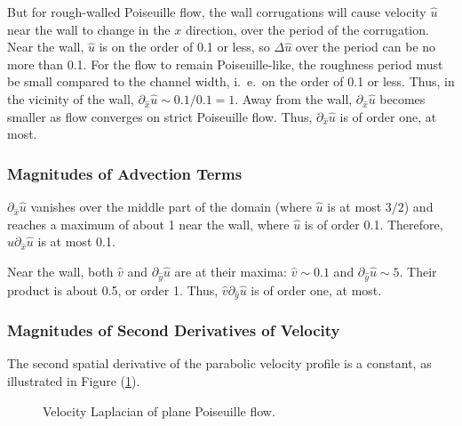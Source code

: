 \documentclass[12pt, a4paper, twoside, openright]{book}
\begin{document}
But for rough-walled Poiseuille flow, the wall corrugations will cause velocity $\hat{u}$ near the wall to change in the $x$ direction, over the period of the corrugation.  Near the wall, $\hat{u}$ is on the order of 0.1 or less, so $\Delta \hat{u}$ over the period can be no more than 0.1.  For the flow to remain Poiseuille-like, the roughness period must be small compared to the channel width, i.\ e.\ on the order of 0.1 or less. Thus, in the vicinity of the wall, $\partial_{\hat{x}} \hat{u} \sim 0.1 / 0.1 = 1$.  Away from the wall, $\partial_{\hat{x}} \hat{u}$ becomes smaller as flow converges on strict Poiseuille flow.  Thus, $\partial_{\hat{x}} \hat{u}$ is of order one, at most.


\subsubsection{Magnitudes of Advection Terms}


$\partial_{\hat{x}} \hat{u}$ vanishes over the middle part of the domain (where $\hat{u}$ is at most $3/2$) and reaches a maximum of about 1 near the wall, where $\hat{u}$ is of order 0.1.  Therefore, $\hat{u} \partial_{\hat{x}} \hat{u}$ is at most 0.1.

Near the wall, both $\hat{v}$ and $\partial_{\hat{y}} \hat{u}$ are at their maxima: $\hat{v} \sim 0.1$ and $\partial_{\hat{y}} \hat{u} \sim 5 $. Their product is about 0.5, or order 1.  Thus, $\hat{v} \partial_{\hat{y}} \hat{u}$ is of order one, at most.

\subsubsection{Magnitudes of Second Derivatives of Velocity}

The second spatial derivative of the parabolic velocity profile is a constant, as illustrated in Figure (\ref{poiselap}).
\begin{figure}[ht]
\centering
{}
\caption{Velocity Laplacian of plane Poiseuille flow.}\label{poiselap}
\end{figure}
\end{document}
